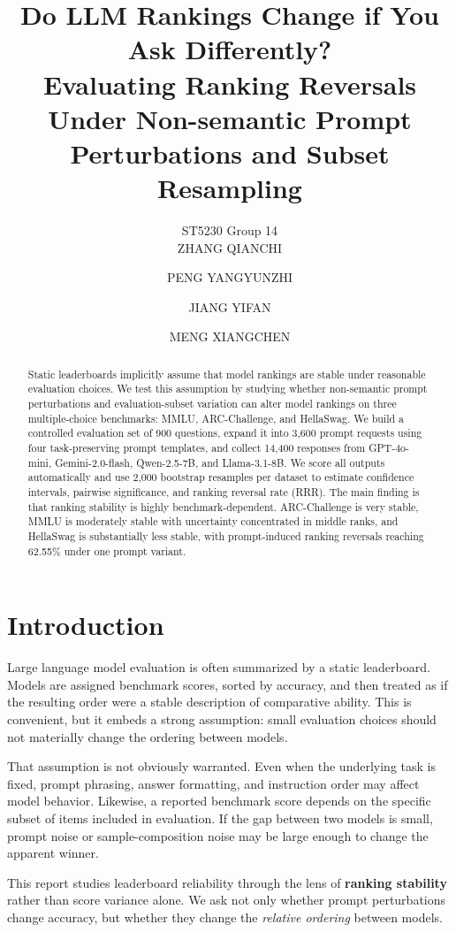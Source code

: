\documentclass[11pt]{article}
\title{Do LLM Rankings Change if You Ask Differently?\\
\large Evaluating Ranking Reversals Under Non-semantic Prompt Perturbations and Subset Resampling}
\author{ST5230 Group 14\\
ZHANG QIANCHI \and PENG YANGYUNZHI \and JIANG YIFAN \and MENG XIANGCHEN}
\date{}
\begin{document}
\maketitle

\begin{abstract}
Static leaderboards implicitly assume that model rankings are stable under reasonable evaluation choices. We test this assumption by studying whether non-semantic prompt perturbations and evaluation-subset variation can alter model rankings on three multiple-choice benchmarks: MMLU, ARC-Challenge, and HellaSwag. We build a controlled evaluation set of 900 questions, expand it into 3,600 prompt requests using four task-preserving prompt templates, and collect 14,400 responses from GPT-4o-mini, Gemini-2.0-flash, Qwen-2.5-7B, and Llama-3.1-8B. We score all outputs automatically and use 2,000 bootstrap resamples per dataset to estimate confidence intervals, pairwise significance, and ranking reversal rate (RRR). The main finding is that ranking stability is highly benchmark-dependent. ARC-Challenge is very stable, MMLU is moderately stable with uncertainty concentrated in middle ranks, and HellaSwag is substantially less stable, with prompt-induced ranking reversals reaching 62.55\% under one prompt variant.
\end{abstract}

\section{Introduction}

Large language model evaluation is often summarized by a static leaderboard. Models are assigned benchmark scores, sorted by accuracy, and then treated as if the resulting order were a stable description of comparative ability. This is convenient, but it embeds a strong assumption: small evaluation choices should not materially change the ordering between models.

That assumption is not obviously warranted. Even when the underlying task is fixed, prompt phrasing, answer formatting, and instruction order may affect model behavior. Likewise, a reported benchmark score depends on the specific subset of items included in evaluation. If the gap between two models is small, prompt noise or sample-composition noise may be large enough to change the apparent winner.

This report studies leaderboard reliability through the lens of \textbf{ranking stability} rather than score variance alone. We ask not only whether prompt perturbations change accuracy, but whether they change the \emph{relative ordering} between models.
\end{document}

